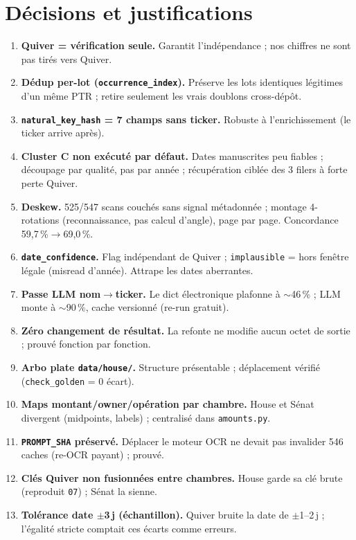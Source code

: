 \documentclass[11pt,a4paper]{article}
\begin{document}
\section{Décisions et justifications}
\begin{enumerate}[nosep,leftmargin=1.5em]
\item \textbf{Quiver = vérification seule.} Garantit l'indépendance ; nos chiffres ne sont pas tirés vers Quiver.
\item \textbf{Dédup per-lot (\texttt{occurrence\_index}).} Préserve les lots identiques légitimes d'un même PTR ; retire seulement les vrais doublons cross-dépôt.
\item \textbf{\texttt{natural\_key\_hash} = 7 champs sans ticker.} Robuste à l'enrichissement (le ticker arrive après).
\item \textbf{Cluster C non exécuté par défaut.} Dates manuscrites peu fiables ; découpage par qualité, pas par année ; récupération ciblée des 3 filers à forte perte Quiver.
\item \textbf{Deskew.} 525/547 scans couchés sans signal métadonnée ; montage 4-rotations (reconnaissance, pas calcul d'angle), page par page. Concordance 59,7\,\%$\rightarrow$69,0\,\%.
\item \textbf{\texttt{date\_confidence}.} Flag indépendant de Quiver ; \texttt{implausible} = hors fenêtre légale (misread d'année). Attrape les dates aberrantes.
\item \textbf{Passe LLM nom$\rightarrow$ticker.} Le dict électronique plafonne à $\sim$46\,\% ; LLM monte à $\sim$90\,\%, cache versionné (re-run gratuit).
\item \textbf{Zéro changement de résultat.} La refonte ne modifie aucun octet de sortie ; prouvé fonction par fonction.
\item \textbf{Arbo plate \texttt{data/house/}.} Structure présentable ; déplacement vérifié (\texttt{check\_golden} = 0 écart).
\item \textbf{Maps montant/owner/opération par chambre.} House et Sénat divergent (midpoints, labels) ; centralisé dans \texttt{amounts.py}.
\item \textbf{\texttt{PROMPT\_SHA} préservé.} Déplacer le moteur OCR ne devait pas invalider 546 caches (re-OCR payant) ; prouvé.
\item \textbf{Clés Quiver non fusionnées entre chambres.} House garde sa clé brute (reproduit \texttt{07}) ; Sénat la sienne.
\item \textbf{Tolérance date $\pm$3\,j (échantillon).} Quiver bruite la date de $\pm$1--2\,j ; l'égalité stricte comptait ces écarts comme erreurs.

\end{enumerate}
\end{document}

